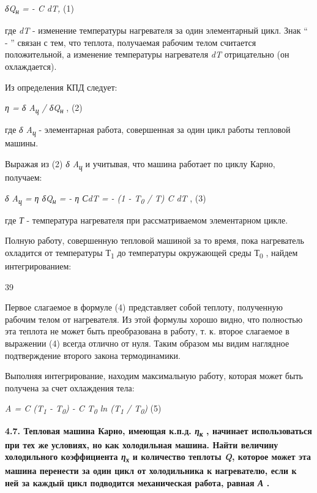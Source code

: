 \emph{δQ\textsubscript{н} = - C dT,} (1)

где \emph{dT} - изменение температуры нагревателя за один элементарный
цикл. Знак `` - '' связан с тем, что теплота, получаемая рабочим телом
считается положительной, а изменение температуры нагревателя \emph{dT}
отрицательно (он охлаждается).

Из определения КПД следует:

\emph{η = δ A\textsubscript{ц} / δQ\textsubscript{н}} , (2)

где \emph{δ A\textsubscript{ц}} - элементарная работа, совершенная за
один цикл работы тепловой машины.

Выражая из (2) \emph{δ A\textsubscript{ц}} и учитывая, что машина
работает по циклу Карно, получаем:

\emph{δ A\textsubscript{ц} = η δQ\textsubscript{н} = - η СdT = - (1 -
T\textsubscript{0} / T) C dT} , (3)

где \emph{Т} - температура нагревателя при рассматриваемом элементарном
цикле.

Полную работу, совершенную тепловой машиной за то время, пока
нагреватель охладится от температуры Т\textsubscript{1} до температуры
окружающей среды Т\textsubscript{0} , найдем интегрированием:

39


Первое слагаемое в формуле (4) представляет собой теплоту, полученную
рабочим телом от нагревателя. Из этой формулы хорошо видно, что
полностью эта теплота не может быть преобразована в работу, т. к. второе
слагаемое в выражении (4) всегда отлично от нуля. Таким образом мы видим
наглядное подтверждение второго закона термодинамики.

Выполняя интегрирование, находим максимальную работу, которая может быть
получена за счет охлаждения тела:

\emph{A = C (T\textsubscript{1} - T\textsubscript{0}) - C
T\textsubscript{0} ln (T\textsubscript{1} / T\textsubscript{0})} (5)

\textbf{4.7. Тепловая машина Карно, имеющая к.п.д.
\emph{η\textsubscript{к}} , начинает использоваться при тех же условиях,
но как холодильная машина. Найти величину холодильного коэффициента
\emph{η\textsubscript{х}} и количество теплоты \emph{Q}, которое может
эта машина перенести за один цикл от холодильника к нагревателю, если к
ней за каждый цикл подводится механическая работа, равная \emph{А} .}

\solving{}

